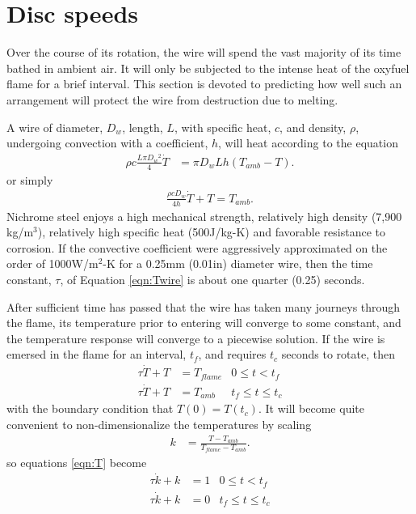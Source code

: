 \section{Disc speeds}\label{sec:speed}

Over the course of its rotation, the wire will spend the vast majority of its time bathed in ambient air.  It will only be subjected to the intense heat of the oxyfuel flame for a brief interval.  This section is devoted to predicting how well such an arrangement will protect the wire from destruction due to melting.

A wire of diameter, $D_w$, length, $L$, with specific heat, $c$, and density, $\rho$, undergoing convection with a coefficient, $h$, will heat according to the equation
\begin{align}
\rho c \frac{L \pi D_w{^2}}{4} \dot{T} &= \pi D_w L h\left(T_{amb} - T\right).\nonumber
\end{align}
or simply
\begin{align}
\frac{\rho c D_w}{4 h} \dot{T} + T = T_{amb}.\label{eqn:Twire}
\end{align}
Nichrome steel enjoys a high mechanical strength, relatively high density (7,900 kg/m$^3$), relatively high specific heat (500J/kg-K) and favorable resistance to corrosion.  If the convective coefficient were aggressively approximated on the order of 1000W/m$^2$-K for a 0.25mm (0.01in) diameter wire, then the time constant, $\tau$, of Equation \ref{eqn:Twire} is about one quarter (0.25) seconds.

After sufficient time has passed that the wire has taken many journeys through the flame, its temperature prior to entering will converge to some constant, and the temperature response will converge to a piecewise solution.  If the wire is emersed in the flame for an interval, $t_f$, and requires $t_c$ seconds to rotate, then 
\begin{subequations}\label{eqn:T}
\begin{align}
\tau \dot{T} + T &= T_{flame} & 0 \le t < t_f\label{eqn:T:tf}\\
\tau \dot{T} + T &= T_{amb} & t_f \le t \le t_c\label{eqn:T:ta}
\end{align}
\end{subequations}
with the boundary condition that $T(0) = T(t_c)$.  It will become quite convenient to non-dimensionalize the temperatures by scaling
\begin{align}
k &= \frac{T - T_{amb}}{T_{flame} - T_{amb}}.
\end{align}
so equations \ref{eqn:T} become
\begin{subequations}
\begin{align}
\tau \dot{k} + k &= 1 & 0 \le t < t_f\label{eqn:k:tf}\\
\tau \dot{k} + k &= 0 & t_f \le t \le t_c\label{eqn:k:ta}
\end{align}
\end{subequations}

